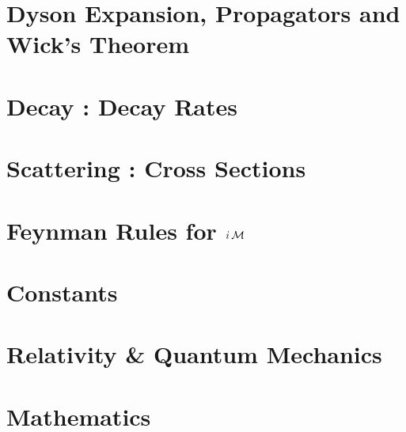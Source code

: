 \documentclass[landscape,8pt,a4paper,english]{extarticle}
\begin{document}
\begin{multicols*}{3}
        \section*{Dyson Expansion, Propagators and Wick's Theorem}
        \section*{Decay : Decay Rates}
        \section*{Scattering : Cross Sections}
        \section*{Feynman Rules for $i\operatorname{\mathcal{M}}$}
        \section*{Constants}
        \section*{Relativity \& Quantum Mechanics}
        \section*{Mathematics}\vfill
\end{multicols*}
\end{document}
